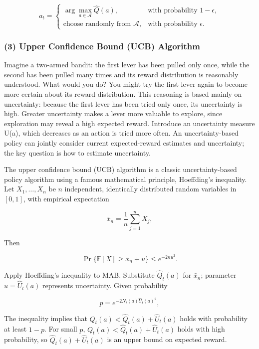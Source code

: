 \[
a_t=
\begin{cases}
\arg\max\limits_{a\in\mathcal{A}} \hat{Q}(a), & \text{with probability } 1-\epsilon,\\
\text{choose randomly from }\mathcal{A}, & \text{with probability } \epsilon.
\end{cases}
\]

\hypertarget{upper-confidence-bound-ucb-algorithm}{%
\subsubsection{(3) Upper Confidence Bound (UCB) Algorithm}\label{upper-confidence-bound-ucb-algorithm}}

Imagine a two-armed bandit: the first lever has been pulled only once, while the second has been pulled many times and its reward distribution is reasonably understood. What would you do? You might try the first lever again to become more certain about its reward distribution. This reasoning is based mainly on uncertainty: because the first lever has been tried only once, its uncertainty is high. Greater uncertainty makes a lever more valuable to explore, since exploration may reveal a high expected reward. Introduce an uncertainty measure U(a), which decreases as an action is tried more often. An uncertainty-based policy can jointly consider current expected-reward estimates and uncertainty; the key question is how to estimate uncertainty.

The upper confidence bound (UCB) algorithm is a classic uncertainty-based policy algorithm using a famous mathematical principle, Hoeffding's inequality. Let \(X_1,\ldots,X_n\) be \(n\) independent, identically distributed random variables in \([0,1]\), with empirical expectation

\[
\bar{x}_n=\frac{1}{n}\sum_{j=1}^{n} X_j,
\]

Then

\[
\Pr\{\mathbb{E}[X]\ge \bar{x}_n+u\}\le e^{-2nu^{2}}.
\]

Apply Hoeffding's inequality to MAB. Substitute \(\hat{Q}_t(a)\) for \(\bar{x}_n\); parameter \(u=\hat{U}_t(a)\) represents uncertainty. Given probability

\[
p=e^{-2N_t(a)\hat{U}_t(a)^{2}},
\]

The inequality implies that \(Q_t(a)<\hat{Q}_t(a)+\hat{U}_t(a)\) holds with probability at least \(1-p\). For small \(p\), \(Q_t(a)<\hat{Q}_t(a)+\hat{U}_t(a)\) holds with high probability, so \(\hat{Q}_t(a)+\hat{U}_t(a)\) is an upper bound on expected reward.


